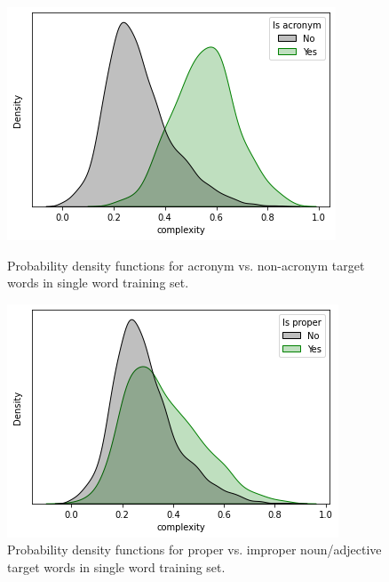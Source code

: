 \documentclass{dcthesis}
\theoremstyle{definition}
\theoremstyle{remark}
\begin{document}
\begin{figure}
  \centering
  \begin{minipage}[b]{0.45\textwidth}
    \includegraphics[width=\textwidth]{is_acronym.png}
    \caption{\label{fig:is_acronym} Probability density functions for acronym vs. non-acronym target words in single word training set.}
  \end{minipage}
  \hfill
  \begin{minipage}[b]{0.45\textwidth}
    \includegraphics[width=\textwidth]{is_proper.png}
    \caption{\label{fig:is_proper} Probability density functions for proper vs. improper noun/adjective target words in single word training set.}
  \end{minipage}
\end{figure}
\end{document}
